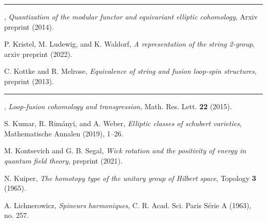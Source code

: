 \begin{description}[leftmargin=5.6em,labelwidth=5.2em,labelsep=0.4em,itemsep=0.5ex,parsep=0pt,topsep=0.8ex]
\item[\textbf{[Kit14]}] \rule[0.45ex]{2.6em}{0.45pt}, \textit{Quantization of the modular functor and equivariant elliptic cohomology}, Arxiv preprint (2014).
\item[\textbf{[KLW22]}] P. Kristel, M. Ludewig, and K. Waldorf, \textit{A representation of the string 2-group}, arxiv preprint (2022).
\item[\textbf{[KM13]}] C. Kottke and R. Melrose, \textit{Equivalence of string and fusion loop-spin structures}, preprint (2013).
\item[\textbf{[KM15]}] \rule[0.45ex]{2.6em}{0.45pt}, \textit{Loop-fusion cohomology and transgression}, Math. Res. Lett. \textbf{22} (2015).
\item[\textbf{[KRW19]}] S. Kumar, R. Rim\'anyi, and A. Weber, \textit{Elliptic classes of schubert varieties}, Mathematische Annalen (2019), 1--26.
\item[\textbf{[KS21]}] M. Kontsevich and G. B. Segal, \textit{Wick rotation and the positivity of energy in quantum field theory}, preprint (2021).
\item[\textbf{[Kui65]}] N. Kuiper, \textit{The homotopy type of the unitary group of Hilbert space}, Topology \textbf{3} (1965).
\item[\textbf{[Lic63]}] A. Lichnerowicz, \textit{Spineurs harmoniques}, C. R. Acad. Sci. Paris S\'erie A (1963), no. 257.


\end{description}

